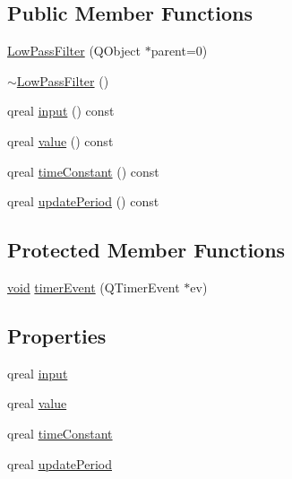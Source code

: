 \subsection*{Public Member Functions}
\begin{DoxyCompactItemize}
\item 
\hyperlink{class_low_pass_filter_a34f68a23df793e64436da736a7580423}{Low\-Pass\-Filter} (Q\-Object $\ast$parent=0)
\item 
\hyperlink{class_low_pass_filter_a0c3f3acc5df212a1e702252af9cb27ef}{$\sim$\-Low\-Pass\-Filter} ()
\item 
qreal \hyperlink{class_low_pass_filter_a2b06f75027c1663872aae67bdbdf0579}{input} () const 
\item 
qreal \hyperlink{class_low_pass_filter_ab6afdd634d2f59a7e7b3391a62f226eb}{value} () const 
\item 
qreal \hyperlink{class_low_pass_filter_a93af69b2fc850730ad5053b2dc5832d0}{time\-Constant} () const 
\item 
qreal \hyperlink{class_low_pass_filter_a5e78b303f3293ed766297d6441dcfdbb}{update\-Period} () const 
\end{DoxyCompactItemize}
\subsection*{Protected Member Functions}
\begin{DoxyCompactItemize}
\item 
\hyperlink{group___u_a_v_objects_plugin_ga444cf2ff3f0ecbe028adce838d373f5c}{void} \hyperlink{class_low_pass_filter_a56d8065f6aba6ab1e3dff9a337d6d797}{timer\-Event} (Q\-Timer\-Event $\ast$ev)
\end{DoxyCompactItemize}
\subsection*{Properties}
\begin{DoxyCompactItemize}
\item 
qreal \hyperlink{class_low_pass_filter_a9a9e7b2ff54b0fc7268a5cc3e9e6fbf4}{input}
\item 
qreal \hyperlink{class_low_pass_filter_abf649373a1b2f12fc6b6ffa4842dc2f7}{value}
\item 
qreal \hyperlink{class_low_pass_filter_ab761ee5ebd0249c6724c17d1e0d42500}{time\-Constant}
\item 
qreal \hyperlink{class_low_pass_filter_a2587a6787fa752084a473ec21a25222a}{update\-Period}
\end{DoxyCompactItemize}


